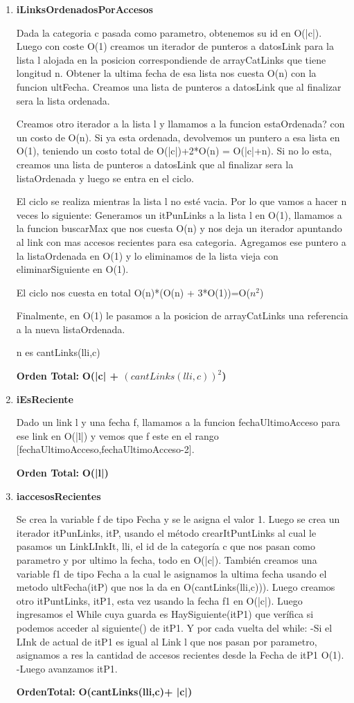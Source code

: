 \begin{enumerate}
\item\textbf{iLinksOrdenadosPorAccesos}
\par Dada la categoria c pasada como parametro, obtenemos su id en O(|c|). Luego con coste O(1) creamos un iterador de punteros a datosLink para la lista l alojada en la posicion correspondiende de arrayCatLinks que tiene longitud n. Obtener la ultima fecha de esa lista nos cuesta O(n) con la funcion ultFecha. Creamos una lista de punteros a datosLink que al finalizar sera la lista ordenada.
\par Creamos otro iterador a la lista l y llamamos a la funcion estaOrdenada? con un costo de O(n). Si ya esta ordenada, devolvemos un puntero a esa lista en O(1), teniendo un costo total de O(|c|)+2*O(n) = O(|c|+n). Si no lo esta, creamos una lista de punteros a datosLink que al finalizar sera la listaOrdenada y luego se entra en el ciclo.
\par El ciclo se realiza mientras la lista l no esté vacia. Por lo que vamos a hacer n veces lo siguiente: Generamos un itPunLinks a la lista l en O(1), llamamos a la funcion buscarMax que nos cuesta O(n) y nos deja un iterador apuntando al link con mas accesos recientes para esa categoria. Agregamos ese puntero a la listaOrdenada en O(1) y lo eliminamos de la lista vieja con eliminarSiguiente en O(1).
\par El ciclo nos cuesta en total O(n)*(O(n) + 3*O(1))=O($n^2$)
\par Finalmente, en O(1) le pasamos a la posicion de arrayCatLinks una referencia a la nueva listaOrdenada.
\par n es cantLinks(lli,c)
\par\textbf{Orden Total:} \textbf{O(|c| + $(cantLinks(lli,c))^2$)}

\item\textbf{iEsReciente}
\par Dado un link l y una fecha f, llamamos a la funcion fechaUltimoAcceso para ese link en O(|l|) y vemos que f este en el rango [fechaUltimoAcceso,fechaUltimoAcceso-2].
\par\textbf{Orden Total:} \textbf{O(|l|)}

\item\textbf{iaccesosRecientes}
\par Se crea la variable f de tipo Fecha y se le asigna el valor 1. Luego se crea un iterador itPunLinks, itP, usando el método crearItPuntLinks al cual
le pasamos un LinkLInkIt, lli, el id de la categoría c que nos pasan como parametro y por ultimo la fecha, todo en O(|c|). También creamos una
variable f1 de tipo Fecha a la cual le asignamos la ultima fecha usando el metodo ultFecha(itP) que nos la da en 
O(cantLinks(lli,c))). Luego creamos otro itPuntLinks, itP1, esta vez usando la fecha f1 en O(|c|).
Luego ingresamos el While cuya guarda es HaySiguiente(itP1) que verífica si podemos acceder al siguiente() de itP1. Y por cada vuelta del while:
-Si el LInk de actual de itP1 es igual al Link l que nos pasan por parametro, asignamos a res la cantidad de accesos recientes 
desde la Fecha de itP1 O(1).
-Luego avanzamos itP1.
\par\textbf{OrdenTotal:} \textbf{O(cantLinks(lli,c)+ |c|)}

\end{enumerate}



